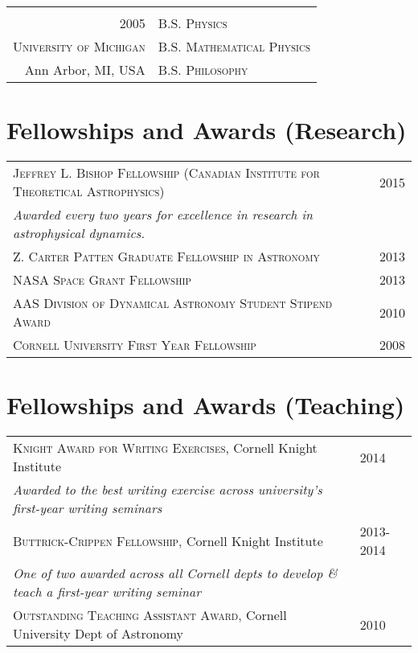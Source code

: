 \documentclass[10pt]{article} %
\begin{document}
{\begin{tabular}{r|p{11cm}}
\multicolumn{2}{c}{} \\


\textsc{2005} & \textsc{B.S. Physics} \\
\textsc{University of Michigan} & \textsc{B.S. Mathematical Physics} \\
Ann Arbor, MI, USA & \textsc{B.S. Philosophy} \\
\end{tabular}


\section{Fellowships and Awards (Research)}

\begin{tabular}{l>{\hfill}p{1.1cm}}
\textsc{Jeffrey L. Bishop Fellowship (Canadian Institute for Theoretical Astrophysics)} & 2015 \\
{\it Awarded every two years for excellence in research in astrophysical dynamics.} \\
\textsc{Z. Carter Patten Graduate Fellowship in Astronomy} & 2013 \\
\textsc{NASA Space Grant Fellowship} & 2013 \\
\textsc{AAS Division of Dynamical Astronomy Student Stipend Award} & 2010\\
\textsc{Cornell University First Year Fellowship} & 2008 \\
\end{tabular}

\section{Fellowships and Awards (Teaching)}

\begin{tabular}{l>{\hfill}p{}}
\textsc{Knight Award for Writing Exercises}, Cornell Knight Institute & 2014 \\
{\it Awarded to the best writing exercise across university's first-year writing seminars} \\
\textsc{Buttrick-Crippen Fellowship}, Cornell Knight Institute & 2013-2014 \\
{\it One of two awarded across all Cornell depts to develop \& teach a first-year writing seminar} \\
\textsc{Outstanding Teaching Assistant Award}, Cornell University Dept of Astronomy & 2010 \\
\end{tabular}


}
\end{document}
